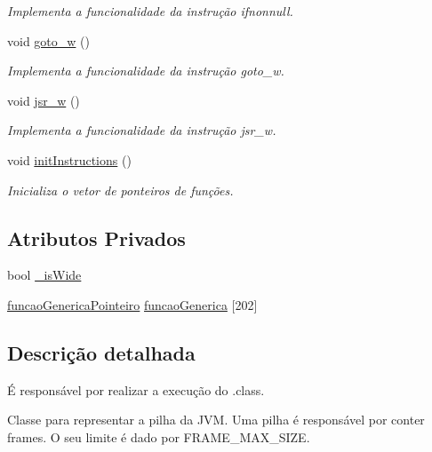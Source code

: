\begin{DoxyCompactItemize}
\begin{DoxyCompactList}\small\item\em Implementa a funcionalidade da instrução ifnonnull. \end{DoxyCompactList}\item 
void \hyperlink{classOperations_aed8436ead5dfcaef69b24e1b2fff7744}{goto\+\_\+w} ()
\begin{DoxyCompactList}\small\item\em Implementa a funcionalidade da instrução goto\+\_\+w. \end{DoxyCompactList}\item 
void \hyperlink{classOperations_a22241dabd3678c4ab77bbe5882c3a4db}{jsr\+\_\+w} ()
\begin{DoxyCompactList}\small\item\em Implementa a funcionalidade da instrução jsr\+\_\+w. \end{DoxyCompactList}\item 
void \hyperlink{classOperations_ae0d60fc4bf4279ae24bdb47cb3634045}{init\+Instructions} ()
\begin{DoxyCompactList}\small\item\em Inicializa o vetor de ponteiros de funções. \end{DoxyCompactList}\end{DoxyCompactItemize}
\subsection*{Atributos Privados}
\begin{DoxyCompactItemize}
\item 
bool \hyperlink{classOperations_ab20aea5d0327c8100d12b217ecbbd62c}{\+\_\+is\+Wide}
\item 
\hyperlink{Operations_8h_a40aa26aea6df6f70ca74e7547328d316}{funcao\+Generica\+Pointeiro} \hyperlink{classOperations_a5576f742afb9d43d3ea33f2ddd33fd43}{funcao\+Generica} \mbox{[}202\mbox{]}
\end{DoxyCompactItemize}


\subsection{Descrição detalhada}
É responsável por realizar a execução do .class. 

Classe para representar a pilha da J\+VM. Uma pilha é responsável por conter frames. O seu limite é dado por {\ttfamily F\+R\+A\+M\+E\+\_\+\+M\+A\+X\+\_\+\+S\+I\+ZE}.

